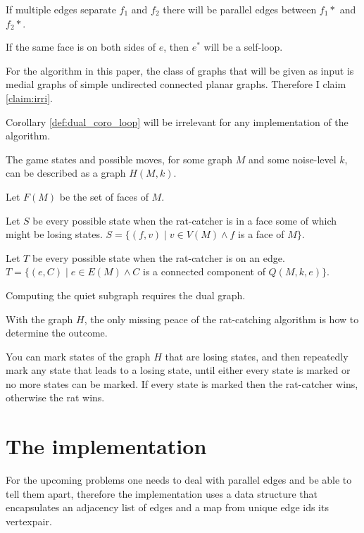 \documentclass{article}
\begin{document}
	\begin{corollary}
		If multiple edges separate $f_1$ and $f_2$ there will be parallel edges between $f_1*$ and $f_2*$.
	\end{corollary}
	
	\begin{corollary}\label{def:dual_coro_loop}
		If the same face is on both sides of $e$, then $e^*$ will be a self-loop.
	\end{corollary}

	For the algorithm in this paper, the class of graphs that will be given as input is medial graphs of simple undirected connected planar graphs. Therefore I claim \ref{claim:irri}.

	\begin{claim}\label{claim:irri}
		Corollary \ref{def:dual_coro_loop} will be irrelevant for any implementation of the algorithm.
	\end{claim}

	The game states and possible moves, for some graph $M$ and some noise-level $k$, can be described as a graph $H(M, k)$.

	Let $F(M)$ be the set of faces of $M$.

	Let $S$ be every possible state when the rat-catcher is in a face some of which might be losing states. $S = \{ (f, v) \mid v \in V(M) \land f$ is a face of $ M \}$.

	Let $T$ be every possible state when the rat-catcher is on an edge. $T = \{ (e, C) \mid e \in E(M) \land C$ is a connected component of $Q(M, k, e) \}$.

	Computing the quiet subgraph requires the dual graph. 
	
	With the graph $H$, the only missing peace of the rat-catching algorithm is how to determine the outcome.

	You can mark states of the graph $H$ that are losing states, and then repeatedly mark any state that leads to a losing state, until either every state is marked or no more states can be marked. If every state is marked then the rat-catcher wins, otherwise the rat wins.

\section{The implementation}

	For the upcoming problems one needs to deal with parallel edges and be able to tell them apart, therefore the implementation uses a data structure that encapsulates an adjacency list of edges and a map from unique edge ids its vertexpair.
\end{document}
